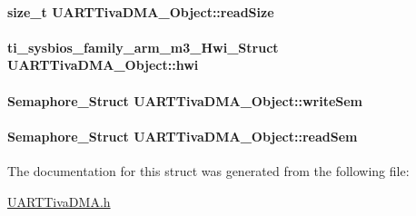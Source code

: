 \paragraph[{read\-Size}]{\setlength{\rightskip}{0pt plus 5cm}size\-\_\-t U\-A\-R\-T\-Tiva\-D\-M\-A\-\_\-\-Object\-::read\-Size}\label{struct_u_a_r_t_tiva_d_m_a___object_ad223d07a1814962421a0968e787449cc}
\paragraph[{hwi}]{\setlength{\rightskip}{0pt plus 5cm}ti\-\_\-sysbios\-\_\-family\-\_\-arm\-\_\-m3\-\_\-\-Hwi\-\_\-\-Struct U\-A\-R\-T\-Tiva\-D\-M\-A\-\_\-\-Object\-::hwi}\label{struct_u_a_r_t_tiva_d_m_a___object_a6d53ea962b0b237a2d53937665733798}
\paragraph[{write\-Sem}]{\setlength{\rightskip}{0pt plus 5cm}Semaphore\-\_\-\-Struct U\-A\-R\-T\-Tiva\-D\-M\-A\-\_\-\-Object\-::write\-Sem}\label{struct_u_a_r_t_tiva_d_m_a___object_aa594694853d811a1e06cc553f90acb2c}
\paragraph[{read\-Sem}]{\setlength{\rightskip}{0pt plus 5cm}Semaphore\-\_\-\-Struct U\-A\-R\-T\-Tiva\-D\-M\-A\-\_\-\-Object\-::read\-Sem}\label{struct_u_a_r_t_tiva_d_m_a___object_a8d92851a2c895c372a500654d7a483a9}


The documentation for this struct was generated from the following file\-:\begin{DoxyCompactItemize}
\item 
\hyperlink{_u_a_r_t_tiva_d_m_a_8h}{U\-A\-R\-T\-Tiva\-D\-M\-A.\-h}\end{DoxyCompactItemize}
